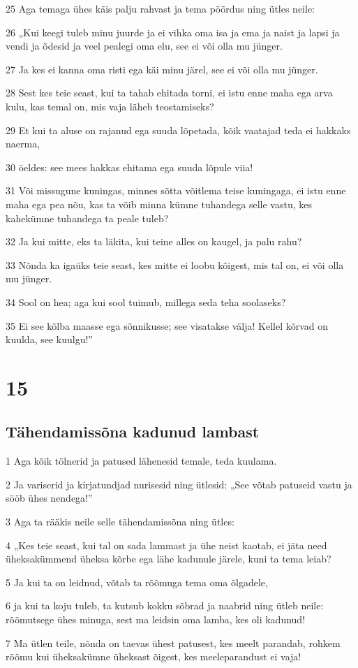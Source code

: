 \par 25 Aga temaga ühes käis palju rahvast ja tema pöördus ning ütles neile:
\par 26 „Kui keegi tuleb minu juurde ja ei vihka oma isa ja ema ja naist ja lapsi ja vendi ja õdesid ja veel pealegi oma elu, see ei või olla mu jünger.
\par 27 Ja kes ei kanna oma risti ega käi minu järel, see ei või olla mu jünger.
\par 28 Sest kes teie seast, kui ta tahab ehitada torni, ei istu enne maha ega arva kulu, kas temal on, mis vaja läheb teostamiseks?
\par 29 Et kui ta aluse on rajanud ega suuda lõpetada, kõik vaatajad teda ei hakkaks naerma,
\par 30 öeldes: see mees hakkas ehitama ega suuda lõpule viia!
\par 31 Või missugune kuningas, minnes sõtta võitlema teise kuningaga, ei istu enne maha ega pea nõu, kas ta võib minna kümne tuhandega selle vastu, kes kahekümne tuhandega ta peale tuleb?
\par 32 Ja kui mitte, eks ta läkita, kui teine alles on kaugel, ja palu rahu?
\par 33 Nõnda ka igaüks teie seast, kes mitte ei loobu kõigest, mis tal on, ei või olla mu jünger.
\par 34 Sool on hea; aga kui sool tuimub, millega seda teha soolaseks?
\par 35 Ei see kõlba maasse ega sõnnikusse; see visatakse välja! Kellel kõrvad on kuulda, see kuulgu!”


\chapter{15}

\section*{Tähendamissõna kadunud lambast}

\par 1 Aga kõik tölnerid ja patused lähenesid temale, teda kuulama.
\par 2 Ja variserid ja kirjatundjad nurisesid ning ütlesid: „See võtab patuseid vastu ja sööb ühes nendega!”
\par 3 Aga ta rääkis neile selle tähendamissõna ning ütles:
\par 4 „Kes teie seast, kui tal on sada lammast ja ühe neist kaotab, ei jäta need üheksakümmend üheksa kõrbe ega lähe kadunule järele, kuni ta tema leiab?
\par 5 Ja kui ta on leidnud, võtab ta rõõmuga tema oma õlgadele,
\par 6 ja kui ta koju tuleb, ta kutsub kokku sõbrad ja naabrid ning ütleb neile: rõõmutsege ühes minuga, sest ma leidsin oma lamba, kes oli kadunud!
\par 7 Ma ütlen teile, nõnda on taevas ühest patusest, kes meelt parandab, rohkem rõõmu kui üheksakümne üheksast õigest, kes meeleparandust ei vaja!

